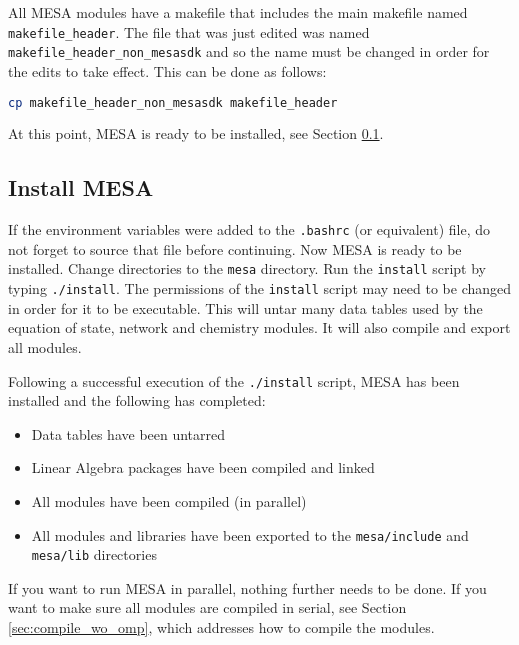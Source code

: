 All {\sf MESA} modules have a makefile that includes the main makefile named 
{\tt makefile\_header}. The file that was just edited was named 
{\tt makefile\_header\_non\_mesasdk} and so the name must be changed in order 
for the edits to take effect. This can be done as follows:
\begin{lstlisting}[language=bash,mathescape=false]
  cp makefile_header_non_mesasdk makefile_header
\end{lstlisting}

At this point, {\sf MESA} is ready to be installed, see Section 
\ref{sec:install}.


\subsection{Install {\sf MESA}}
\label{sec:install}
If the environment variables were added to the {\tt .bashrc} (or equivalent) 
file, do not forget to source that file before continuing. Now {\sf MESA} 
is ready to be installed. Change directories to the {\tt mesa} directory. 
Run the {\tt install} script by typing {\tt ./install}. The permissions of the 
{\tt install} script may need to be changed in order for it to be executable.
This will untar many data tables used by the equation of state, network and 
chemistry modules. It will also compile and export all modules.

Following a successful execution of the {\tt ./install} script, 
{\sf MESA} has been installed and the following has completed:
\begin{itemize}
\item Data tables have been untarred
\item Linear Algebra packages have been compiled and linked
\item All modules have been compiled (in parallel)
\item All modules and libraries have been exported to the {\tt mesa/include} 
and {\tt mesa/lib} directories
\end{itemize}

If you want to run {\sf MESA} in parallel, nothing further needs to be done. 
If you want to make sure all modules are compiled in serial, see Section 
\ref{sec:compile_wo_omp}, which addresses how to compile the modules.

